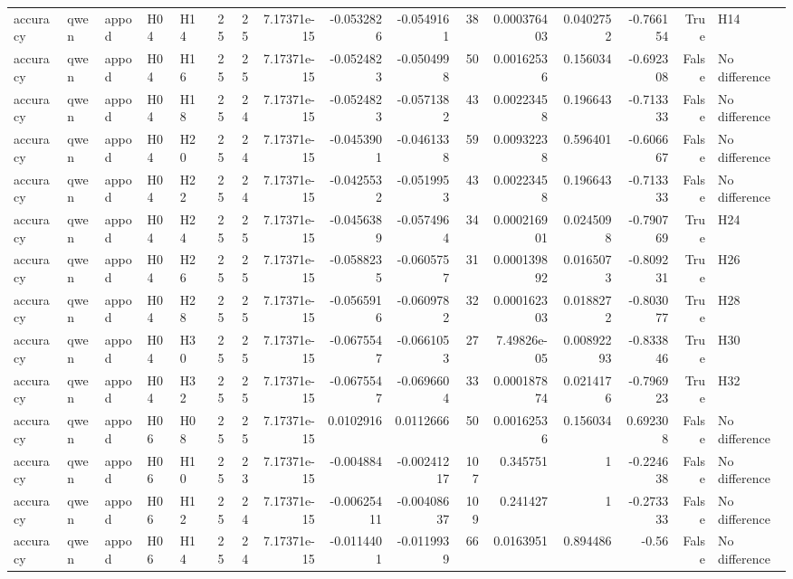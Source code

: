 \begin{longtable}{lllllrrrrrrrrrrl}
accuracy & qwen & appod & H04 & H14 & 25 & 25 & 7.17371e-15 & -0.0532826 & -0.0549161 & 38 & 0.000376403 & 0.0402752 & -0.766154 & True & H14 \\
accuracy & qwen & appod & H04 & H16 & 25 & 25 & 7.17371e-15 & -0.0524823 & -0.0504998 & 50 & 0.00162536 & 0.156034 & -0.692308 & False & No difference \\
accuracy & qwen & appod & H04 & H18 & 25 & 24 & 7.17371e-15 & -0.0524823 & -0.0571382 & 43 & 0.00223458 & 0.196643 & -0.713333 & False & No difference \\
accuracy & qwen & appod & H04 & H20 & 25 & 24 & 7.17371e-15 & -0.0453901 & -0.0461338 & 59 & 0.00932238 & 0.596401 & -0.606667 & False & No difference \\
accuracy & qwen & appod & H04 & H22 & 25 & 24 & 7.17371e-15 & -0.0425532 & -0.0519953 & 43 & 0.00223458 & 0.196643 & -0.713333 & False & No difference \\
accuracy & qwen & appod & H04 & H24 & 25 & 25 & 7.17371e-15 & -0.0456389 & -0.0574964 & 34 & 0.000216901 & 0.0245098 & -0.790769 & True & H24 \\
accuracy & qwen & appod & H04 & H26 & 25 & 25 & 7.17371e-15 & -0.0588235 & -0.0605757 & 31 & 0.000139892 & 0.0165073 & -0.809231 & True & H26 \\
accuracy & qwen & appod & H04 & H28 & 25 & 25 & 7.17371e-15 & -0.0565916 & -0.0609782 & 32 & 0.000162303 & 0.0188272 & -0.803077 & True & H28 \\
accuracy & qwen & appod & H04 & H30 & 25 & 25 & 7.17371e-15 & -0.0675547 & -0.0661053 & 27 & 7.49826e-05 & 0.00892293 & -0.833846 & True & H30 \\
accuracy & qwen & appod & H04 & H32 & 25 & 25 & 7.17371e-15 & -0.0675547 & -0.0696604 & 33 & 0.000187874 & 0.0214176 & -0.796923 & True & H32 \\
accuracy & qwen & appod & H06 & H08 & 25 & 25 & 7.17371e-15 & 0.0102916 & 0.0112666 & 50 & 0.00162536 & 0.156034 & 0.692308 & False & No difference \\
accuracy & qwen & appod & H06 & H10 & 25 & 23 & 7.17371e-15 & -0.004884 & -0.00241217 & 107 & 0.345751 & 1 & -0.224638 & False & No difference \\
accuracy & qwen & appod & H06 & H12 & 25 & 24 & 7.17371e-15 & -0.00625411 & -0.00408637 & 109 & 0.241427 & 1 & -0.273333 & False & No difference \\
accuracy & qwen & appod & H06 & H14 & 25 & 24 & 7.17371e-15 & -0.0114401 & -0.0119939 & 66 & 0.0163951 & 0.894486 & -0.56 & False & No difference \\

\end{longtable}
